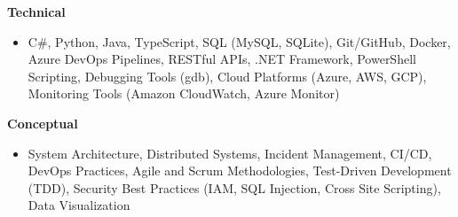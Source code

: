 \textbf{Technical}
\begin{itemize}[leftmargin=1.5em, nosep, noitemsep]
    \item[] 
    C\#,
    Python,
    Java,
    TypeScript,
    SQL (MySQL, SQLite),
    Git/GitHub,
    Docker,
    Azure DevOps Pipelines,
    RESTful APIs,
    .NET Framework,
    PowerShell Scripting,
    Debugging Tools (gdb),
    Cloud Platforms (Azure, AWS, GCP),
    Monitoring Tools (Amazon CloudWatch, Azure Monitor)
\end{itemize}
\textbf{Conceptual}
\begin{itemize}[leftmargin=1.5em, nosep, noitemsep]
    \item[]
    System Architecture,
    Distributed Systems,
    Incident Management,
    CI/CD,
    DevOps Practices,
    Agile and Scrum Methodologies,
    Test-Driven Development (TDD),
    Security Best Practices (IAM, SQL Injection, Cross Site Scripting),
    Data Visualization
\end{itemize}